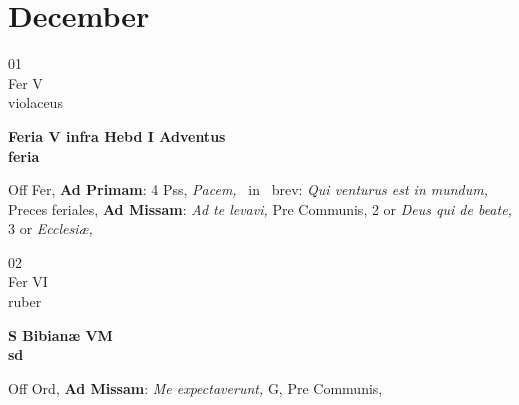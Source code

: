 \documentclass[10pt, openany]{book}
\begin{document}
        \chapter{December}
                        
        \begin{center}
            \begin{minipage}{3.5in}
                \vspace{2em}
                \begin{minipage}{0.5in}
                    {\Huge 01} \\
                    {\normalsize Fer V} \\
                    {\normalsize violaceus}
                \end{minipage}
                \begin{minipage}{3.0in}
                    \textbf{ \large Feria V infra Hebd I Adventus \\
                    \textnormal{\normalsize feria}} \\ 
                \end{minipage}
                \begin{justify}Off Fer, \textbf{Ad Primam}: 4 Pss, \textit{Pacem,} \Vbar\ in \Rbar\ brev: \textit{Qui venturus est in mundum,} Preces feriales, \textbf{Ad Missam}: \textit{Ad te levavi,} Pre Communis, 2 or \textit{Deus qui de beate,} 3 or \textit{Ecclesiæ,}  
                \end{justify}
            \end{minipage}
        \end{center}
    
        \begin{center}
            \begin{minipage}{3.5in}
                \vspace{2em}
                \begin{minipage}{0.5in}
                    {\Huge 02} \\
                    {\normalsize Fer VI} \\
                    {\normalsize ruber}
                \end{minipage}
                \begin{minipage}{3.0in}
                    \textbf{ \large S Bibianæ VM \\
                    \textnormal{\normalsize sd}} \\ 
                \end{minipage}
                \begin{justify}Off Ord, \textbf{Ad Missam}: \textit{Me expectaverunt,} G, Pre Communis,  
                \end{justify}
            \end{minipage}
        \end{center}
    
\end{document}
